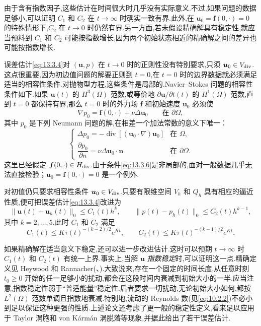由于含有指数因子,这些估计在时间很大时几乎没有实际意义.不过,如果问题的数据足够小,可以证明 \(C_1\) 和 \(C_2\) 在 \(t\to\infty\) 时确实一致有界.此外,在 \(\boldsymbol{u}_0=\boldsymbol{f}(0,\cdot)=0\) 的特殊情形下,\(C_2\) 在 \(t\to0\) 时仍然有界.另一方面,若未假设精确解具有稳定性,就应当预料到 \(C_1\) 和 \(C_2\) 可能按指数增长,因为两个初始状态相近的精确解之间的差异也可能按指数增长.

误差估计\eqref{eq:13.3.4}对 \((\boldsymbol{u},p)\) 在 \(t\to0\) 时的正则性没有特别要求,只须 \(\boldsymbol{u}_0\in V_{\rm div}\).这点很重要,因为初边值问题的解要正则到 \(t=0\),在 \(t=0\) 时的边界数据就必须满足适当的相容性条件.对抛物型方程,这些条件是局部的.Navier--Stokes 问题的相容性条件如下.如果 \(\boldsymbol{u}(t)\) 的 \(H^3(\Omega)\) 范数,或等价地 \(\partial\boldsymbol{u}/\partial t(t)\) 的 \(H^1(\Omega)\) 范数,直到 \(t=0\) 都保持有界,那么 \(t=0\) 时的外力场 \(\boldsymbol{f}\) 和初始速度 \(\boldsymbol{u}_0\) 必须使
\begin{equation}\label{eq:13.3.6}
  \nabla p_0=\boldsymbol{f}(0,\cdot)+\nu\Delta\boldsymbol{u}_0\qquad\text{在 }\partial\Omega,
\end{equation}
其中 \(p_0\) 是下列 Neumann 问题的解,在相差一个加法常数的意义下唯一：
\[
  \begin{cases}
    \Delta p_0=-\operatorname{div}[(\boldsymbol{u}_0\cdot\nabla)\boldsymbol{u}_0]
       & \text{在 }\Omega,\\[2pt]
    \dfrac{\partial p_0}{\partial n}=\nu\Delta\boldsymbol{u}_0\cdot\boldsymbol{n}
       & \text{在 }\partial\Omega.
  \end{cases}
\]
这里已经假定 \(\boldsymbol{f}(0,\cdot)\in H_{\rm div}\).由于条件\eqref{eq:13.3.6}是非局部的,面对一般数据几乎无法直接检验；\(\boldsymbol{u}_0=\boldsymbol{f}(0,\cdot)=0\) 是一个例外.

对初值仍只要求相容性条件 \(\boldsymbol{u}_0\in V_{\rm div}\).只要有限维空间 \(V_h\) 和 \(Q_h\) 具有相应的逼近性质,便可把误差估计\eqref{eq:13.3.4}改进为
\begin{equation}\label{eq:13.3.7}
  \|\boldsymbol{u}(t)-\boldsymbol{u}_h(t)\|_0\le C_1(t)h^k,\qquad
  \|p(t)-p_h(t)\|_0\le C_2(t)h^{k-1},
\end{equation}
其中 \(k=2,\ldots,5\).此时 \(C_1\) 和 \(C_2\) 满足
\begin{equation}\label{eq:13.3.8}
  C_1(t)\le K\tau(t)^{-(k-2)/2}e^{Kt},\qquad
  C_2(t)\le K\tau(t)^{-(k-1)/2}e^{Kt}.
\end{equation}

如果精确解在适当意义下稳定,还可以进一步改进估计.这时可以预期 \(t\to\infty\) 时 \(C_1(t)\) 和 \(C_2(t)\) 有统一上界.事实上,当解 \(\boldsymbol{u}\) \emph{指数稳定}时,可以证明这一点.精确定义见 Heywood 和 Rannacher(、).大致说来,存在一个固定的时间长度,从任意时刻 \(t_0\ge0\) 开始的任一足够小的扰动,都会在这段时间内衰减到初始大小的一半.应当注意,指数稳定性弱于“普适能量”稳定性.后者要求一切扰动,无论初始大小如何,都按 \(L^2(\Omega)\) 范数单调且指数地衰减.特别地,流动的 Reynolds 数(见\eqref{eq:10.2.2})不必小到足以保证这种更强的性质.上述论文还考虑了更一般的稳定性定义,看来足以应用于 Taylor 涡胞和 von Kármán 涡脱落等现象,并据此给出了若干误差估计.

